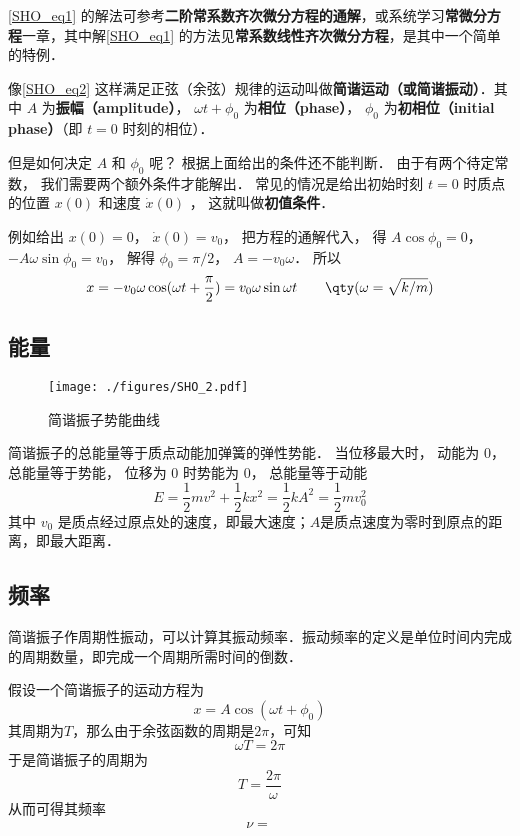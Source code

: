 \autoref{SHO_eq1} 的解法可参考\textbf{二阶常系数齐次微分方程的通解}，或系统学习\textbf{常微分方程}一章，其中解\autoref{SHO_eq1} 的方法见\textbf{常系数线性齐次微分方程}，是其中一个简单的特例．

像\autoref{SHO_eq2} 这样满足正弦（余弦）规律的运动叫做\textbf{简谐运动（或简谐振动）}．其中 $A$ 为\textbf{振幅（amplitude）}， $\omega t + \phi_0$ 为\textbf{相位（phase）}， $\phi_0$ 为\textbf{初相位（initial phase）}（即 $t = 0$ 时刻的相位）． 

但是如何决定 $A$ 和 $\phi_0$ 呢？ 根据上面给出的条件还不能判断． 由于有两个待定常数， 我们需要两个额外条件才能解出． 常见的情况是给出初始时刻 $t = 0$ 时质点的位置 $x(0)$ 和速度 $\dot x(0)$ ， 这就叫做\textbf{初值条件}．

例如给出 $x(0) = 0$，  $\dot x(0) = v_0$， 把方程的通解代入， 得 $A\cos \phi_0 = 0$，  $ - A\omega \sin \phi_0 = v_0$， 解得 $\phi_0 = \pi /2$，  $A =  -v_0\omega $． 所以
\begin{equation}
x =  - v_0\omega \cos (\omega t + \frac{\pi }{2}) = v_0\omega \sin \omega t \qquad \qty(\omega  = \sqrt{k/m})
\end{equation}

\subsection{能量}

\begin{figure}[ht]
\centering
\texttt{[image: ./figures/SHO\_2.pdf]}
\caption{简谐振子势能曲线} \label{SHO_fig2}
\end{figure}

简谐振子的总能量等于质点动能加弹簧的弹性势能． 当位移最大时， 动能为 0， 总能量等于势能， 位移为 0 时势能为 0， 总能量等于动能
\begin{equation}
E = \frac{1}{2} mv^2 + \frac12 k x^2 = \frac12 k A^2 = \frac12 m v_0^2
\end{equation}
其中 $v_0$ 是质点经过原点处的速度，即最大速度；$A$是质点速度为零时到原点的距离，即最大距离．


\subsection{频率}

简谐振子作周期性振动，可以计算其振动频率．振动频率的定义是单位时间内完成的周期数量，即完成一个周期所需时间的倒数．

假设一个简谐振子的运动方程为
\begin{equation}
x=A\cos(\omega t+\phi_0)
\end{equation}
其周期为$T$，那么由于余弦函数的周期是$2\pi$，可知
\begin{equation}
\omega T = 2\pi
\end{equation}
于是简谐振子的周期为
\begin{equation}
T=\frac{2\pi}{\omega}
\end{equation}
从而可得其频率
\begin{equation}
\nu = \frac{}{}
\end{equation}












